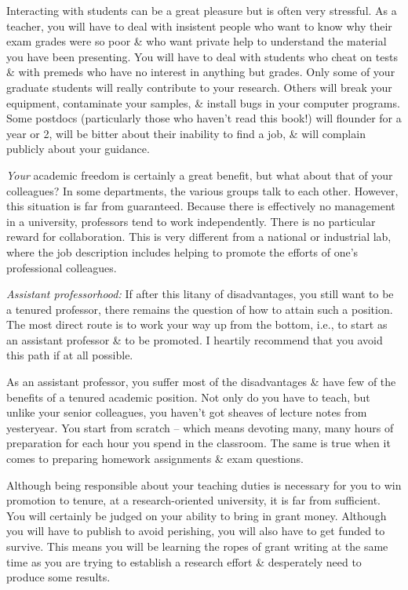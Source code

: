 \documentclass{article}
\begin{document}
\begin{enumerate}
\begin{itemize}
\begin{itemize}
			Interacting with students can be a great pleasure but is often very stressful. As a teacher, you will have to deal with insistent people who want to know why their exam grades were so poor \& who want private help to understand the material you have been presenting. You will have to deal with students who cheat on tests \& with premeds who have no interest in anything but grades. Only some of your graduate students will really contribute to your research. Others will break your equipment, contaminate your samples, \& install bugs in your computer programs. Some postdocs (particularly those who haven't read this book!) will flounder for a year or 2, will be bitter about their inability to find a job, \& will complain publicly about your guidance.

			\textit{Your} academic freedom is certainly a great benefit, but what about that of your colleagues? In some departments, the various groups talk to each other. However, this situation is far from guaranteed. Because there is effectively no management in a university, professors tend to work independently. There is no particular reward for collaboration. This is very different from a national or industrial lab, where the job description includes helping to promote the efforts of one's professional colleagues.

			\textit{Assistant professorhood:} If after this litany of disadvantages, you still want to be a tenured professor, there remains the question of how to attain such a position. The most direct route is to work your way up from the bottom, i.e., to start as an assistant professor \& to be promoted. I heartily recommend that you avoid this path if at all possible.

			As an assistant professor, you suffer most of the disadvantages \& have few of the benefits of a tenured academic position. Not only do you have to teach, but unlike your senior colleagues, you haven't got sheaves of lecture notes from yesteryear. You start from scratch -- which means devoting many, many hours of preparation for each hour you spend in the classroom. The same is true when it comes to preparing homework assignments \& exam questions.

			Although being responsible about your teaching duties is necessary for you to win promotion to tenure, at a research-oriented university, it is far from sufficient. You will certainly be judged on your ability to bring in grant money. Although you will have to publish to avoid perishing, you will also have to get funded to survive. This means you will be learning the ropes of grant writing at the same time as you are trying to establish a research effort \& desperately need to produce some results.


\end{itemize}
\end{itemize}
\end{enumerate}
\end{document}
